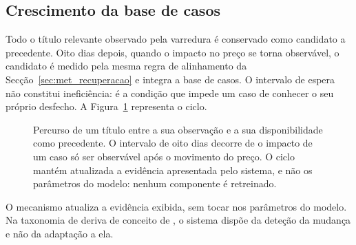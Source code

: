 \subsection{Crescimento da base de casos}
\label{sec:sis_base}

Todo o título relevante observado pela varredura é conservado como candidato a precedente. Oito
dias depois, quando o impacto no preço se torna observável, o candidato é medido pela mesma regra
de alinhamento da Secção~\ref{sec:met_recuperacao} e integra a base de casos. O intervalo de
espera não constitui ineficiência: é a condição que impede um caso de conhecer o seu próprio
desfecho. A Figura~\ref{fig:sis_ciclo_kb} representa o ciclo.

\begin{figure}[htbp]
\centering
{}
\caption[Ciclo de crescimento da base de casos]{Percurso de um título entre a sua observação e a
sua disponibilidade como precedente. O intervalo de oito dias decorre de o impacto de um caso só
ser observável após o movimento do preço. O ciclo mantém atualizada a evidência apresentada pelo
sistema, e não os parâmetros do modelo: nenhum componente é retreinado.}
\label{fig:sis_ciclo_kb}
\end{figure}

O mecanismo atualiza a evidência exibida, sem tocar nos parâmetros do modelo. Na taxonomia de deriva de
conceito de \textcite{gama2014survey}, o sistema dispõe da deteção da mudança e não da adaptação a
ela.


